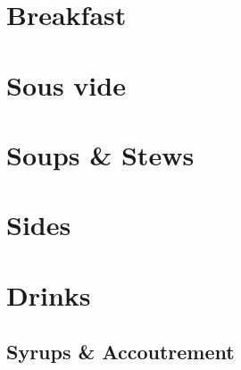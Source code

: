 \documentclass{family_cookbook}
\begin{document}
\chapter{Breakfast}
\minitoc%
\clearpage








\chapter{Sous vide}
\minitoc%
\clearpage





\chapter{Soups \& Stews}
\minitoc%
\clearpage








\chapter{Sides}
\minitoc%
\clearpage









\chapter{Drinks}
\minitoc%
\clearpage
\section{Syrups \& Accoutrement}
{%
	\let\section\subsection%
	\let\subsection\subsubsection%
	
	
	
	
	
	
	
	
	
}

\end{document}
